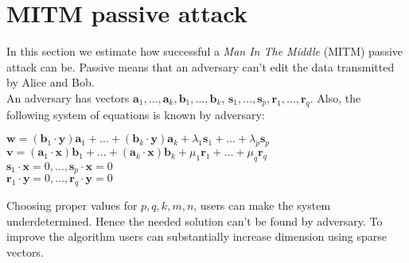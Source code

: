 \section{MITM passive attack}
In this section we estimate how successful a \textit{Man In The Middle} (MITM) passive attack can be. Passive means that an adversary can't edit the data transmitted by Alice and Bob. \\
An adversary has vectors $ \textbf{a}_1, \dots, \textbf{a}_k, \textbf{b}_1, \dots, \textbf{b}_k $, $ \textbf{s}_1, \dots, \textbf{s}_p, \textbf{r}_1, \dots, \textbf{r}_q $. Also, the following system of equations is known by adversary:
\begin{center}
	$\textbf{w} = (\textbf{b}_1 \cdot \textbf{y}) \textbf{a}_1 + \dots + (\textbf{b}_k \cdot \textbf{y}) \textbf{a}_k + \lambda_1 \textbf{s}_1 + \dots + \lambda_p \textbf{s}_p$ \\
	$ \textbf{v} = (\textbf{a}_1 \cdot \textbf{x}) \textbf{b}_1 + \dots + (\textbf{a}_k \cdot \textbf{x}) \textbf{b}_k + \mu_1 \textbf{r}_1 + \dots + \mu_q \textbf{r}_q $ \\
	$\textbf{s}_1 \cdot \textbf{x} = 0, \dots, \textbf{s}_p \cdot \textbf{x} = 0$ \\
	$\textbf{r}_1 \cdot \textbf{y} = 0, \dots, \textbf{r}_q \cdot \textbf{y} = 0 $
\end{center}
Choosing proper values for $ p, q, k, m, n $, users can make the system underdetermined. Hence the needed solution can't be found by adversary. To improve the algorithm users can substantially increase dimension using sparse vectors. 